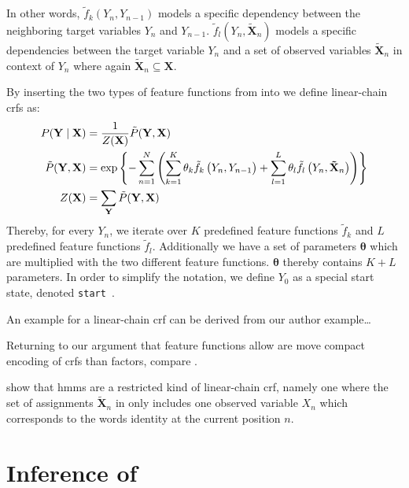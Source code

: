 In other words, $\tilde{f}_k(Y_n,Y_{n-1})$ models a specific dependency between the neighboring \glspl{target variable} $Y_n$ and $Y_{n-1}$. $\tilde{f}_l(Y_n,\mathbf{\tilde{X}}_n)$ models a specific dependencies between the \gls{target variable} $Y_n$ and a set of \glspl{observed variable} $\mathbf{\tilde{X}}_n$ in context of $Y_n$ where again $\mathbf{\tilde{X}}_n\subseteq\mathbf{X}$.

By inserting the two types of \glspl{feature function} from  into  we define \glspl{linear-chain crf} as:
\begin{equation}
  \label{equ:linear-chain-crf-log-linear}
  \begin{split}
    P(\mathbf{Y}\mid\mathbf{X}) & = \frac{1}{Z(\mathbf{X})}\tilde{P}(\mathbf{Y},\mathbf{X})  \\
    \tilde{P}(\mathbf{Y},\mathbf{X}) & = \exp\left\{ -\sum_{n=1}^N \left(\sum_{k=1}^K\theta_k \tilde{f}_k\left(\vphantom{\tilde{X}}Y_n,Y_{n-1}\right)+\sum_{l=1}^L\theta_l \tilde{f}_l\left(Y_n,\mathbf{\tilde{X}}_n\right)\right) \right\} \\
    Z(\mathbf{X}) & = \sum_{\mathbf{Y}}\tilde{P}(\mathbf{Y},\mathbf{X})
  \end{split}
\end{equation}
Thereby, for every $Y_n$, we iterate over $K$ predefined \glspl{feature function} $\tilde{f}_k$ and $L$ predefined \glspl{feature function} $\tilde{f}_l$.
Additionally we have a set of parameters $\bm{\theta}$ which are multiplied with the two different feature functions.
$\bm{\theta}$ thereby contains $K+L$ parameters.
In order to simplify the notation, we define $Y_0$ as a special start state, denoted \texttt{start}~\citep{lafferty2001conditional}.

An example for a  \gls{linear-chain crf} can be derived from our author example\dots{}

Returning to our argument that \glspl{feature function} allow are move compact encoding of \glspl{crf} than \glspl{factor}, compare .

\citet{sutton2010introduction} show that \glspl{hmm} are a restricted kind of \gls{linear-chain crf}, namely one where the set of assignments $\mathbf{\tilde{X}}_n$ in  only includes one \gls{observed variable} $X_n$ which corresponds to the words identity at the current position $n$.

\section{Inference of }\label{sec:inference-crfs}

